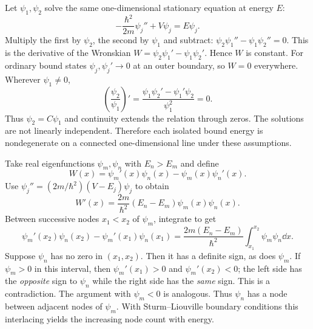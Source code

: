 Let $\psi_1,\psi_2$ solve the same
one-dimensional stationary equation at energy $E$:
\begin{equation}
-\frac{\hbar^2}{2m}\psi_j''+V\psi_j=E\psi_j.
\end{equation}
Multiply the first by $\psi_2$, the second by
$\psi_1$ and subtract:
$\psi_2\psi_1''-\psi_1\psi_2''=0$.
This is the derivative of the Wronskian
$W=\psi_2\psi_1'-\psi_1\psi_2'$.
Hence $W$ is constant. For ordinary bound states
$\psi_j,\psi_j'\to0$ at an outer boundary, so
$W=0$ everywhere. Wherever $\psi_1\ne0$,
\begin{equation}
\left(\frac{\psi_2}{\psi_1}\right)'=
\frac{\psi_1\psi_2'-\psi_1'\psi_2}{\psi_1^2}=0.
\end{equation}
Thus $\psi_2=C\psi_1$ and continuity extends the
relation through zeros. The solutions are not
linearly independent. Therefore each isolated
bound energy is nondegenerate on a connected
one-dimensional line under these assumptions.

Take real eigenfunctions $\psi_m,\psi_n$ with
$E_n>E_m$ and define
\begin{equation}
W(x)=\psi_m'(x)\psi_n(x)-\psi_m(x)\psi_n'(x).
\end{equation}
Use $\psi_j''=(2m/\hbar^2)(V-E_j)\psi_j$
to obtain
\begin{equation}
\boxed{W'(x)=\frac{2m}{\hbar^2}
(E_n-E_m)\psi_m(x)\psi_n(x)}.
\end{equation}
Between successive nodes $x_1<x_2$ of $\psi_m$,
integrate to get
\begin{equation}
\boxed{\psi_m'(x_2)\psi_n(x_2)-
\psi_m'(x_1)\psi_n(x_1)=
\frac{2m(E_n-E_m)}{\hbar^2}
\int_{x_1}^{x_2}\psi_m\psi_n\dd x}.
\end{equation}
Suppose $\psi_n$ has no zero in $(x_1,x_2)$.
Then it has a definite sign, as does $\psi_m$.
If $\psi_m>0$ in this interval, then
$\psi_m'(x_1)>0$ and $\psi_m'(x_2)<0$;
the left side has the \emph{opposite} sign
to $\psi_n$ while the right side has the
\emph{same} sign. This is a contradiction.
The argument with $\psi_m<0$ is analogous.
Thus $\psi_n$ has a node between adjacent
nodes of $\psi_m$. With Sturm--Liouville
boundary conditions this interlacing yields
the increasing node count with energy.
